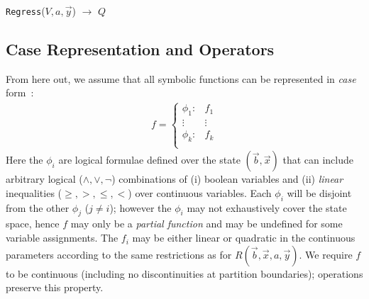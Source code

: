 \incmargin{.5em}
\linesnumbered
\begin{algorithm}[t!]
\vspace{-.5mm}
\dontprintsemicolon
{}


\caption{\footnotesize \texttt{Regress}($V,a,\vec{y}$) $\longrightarrow$ $Q$ \label{alg:regress}}
\vspace{-1mm}
\end{algorithm}
\decmargin{.5em}

\subsection{Case Representation and Operators}

From here out, we assume that all symbolic functions
can be represented in \emph{case} form~\cite{fomdp}:
{%
\begin{align}
f = 
\begin{cases}
  \phi_1: & f_1 \\ 
 \vdots&\vdots\\ 
  \phi_k: & f_k \\ 
\end{cases} \label{eq:case}
\end{align}
}
Here the $\phi_i$ are logical formulae defined over the state
$(\vec{b},\vec{x})$ that can include arbitrary logical ($\land,\lor,\neg$)
combinations of (i) boolean variables and (ii) 
\emph{linear} inequalities ($\geq,>,\leq,<$) 
over continuous variables.  
Each $\phi_i$ will be disjoint from the other $\phi_j$ ($j \neq i$); 
however the $\phi_i$ may not exhaustively cover the state space, hence
$f$ may only be a \emph{partial function} and may be undefined for some
variable assignments.
The $f_i$ may be either linear or quadratic in the continuous parameters
according to the same restrictions as for 
$R(\vec{b},\vec{x},a,\vec{y})$.  
We require $f$ to be continuous 
(including no discontinuities at partition boundaries); 
operations preserve this property.

